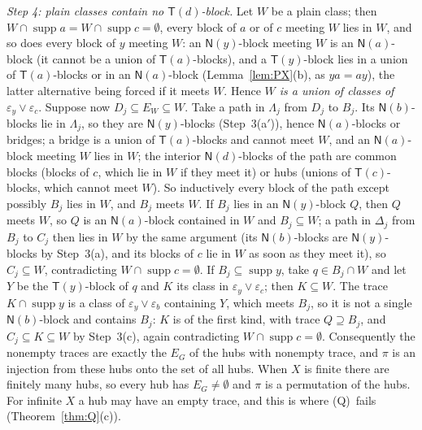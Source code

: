 \documentclass[11pt]{amsart}
\theoremstyle{definition}
\newcommand{\supp}{\operatorname{supp}}
\newcommand{\T}{\mathsf{T}}
\newcommand{\N}{\mathsf{N}}
\newcommand{\Qcond}{\textup{(Q)}}
\begin{document}
\smallskip
\emph{Step 4: plain classes contain no $\T(d)$-block.} Let $W$ be a plain class; then $W\cap\supp a=W\cap\supp c=\emptyset$, every block of $a$ or of $c$ meeting $W$ lies in $W$, and so does every block of $y$ meeting $W$: an $\N(y)$-block meeting $W$ is an $\N(a)$-block (it cannot be a union of $\T(a)$-blocks), and a $\T(y)$-block lies in a union of $\T(a)$-blocks or in an $\N(a)$-block (Lemma~\ref{lem:PX}(b), as $ya=ay$), the latter alternative being forced if it meets $W$. Hence \emph{$W$ is a union of classes of $\varepsilon_y\vee\varepsilon_c$}. Suppose now $D_j\subseteq E_W\subseteq W$. Take a path in $\Lambda_j$ from $D_j$ to $B_j$. Its $\N(b)$-blocks lie in $\Lambda_j$, so they are $\N(y)$-blocks (Step~3(a$'$)), hence $\N(a)$-blocks or bridges; a bridge is a union of $\T(a)$-blocks and cannot meet $W$, and an $\N(a)$-block meeting $W$ lies in $W$; the interior $\N(d)$-blocks of the path are common blocks (blocks of $c$, which lie in $W$ if they meet it) or hubs (unions of $\T(c)$-blocks, which cannot meet $W$). So inductively every block of the path except possibly $B_j$ lies in $W$, and $B_j$ meets $W$. If $B_j$ lies in an $\N(y)$-block $Q$, then $Q$ meets $W$, so $Q$ is an $\N(a)$-block contained in $W$ and $B_j\subseteq W$; a path in $\Delta_j$ from $B_j$ to $C_j$ then lies in $W$ by the same argument (its $\N(b)$-blocks are $\N(y)$-blocks by Step~3(a), and its blocks of $c$ lie in $W$ as soon as they meet it), so $C_j\subseteq W$, contradicting $W\cap\supp c=\emptyset$. If $B_j\subseteq\supp y$, take $q\in B_j\cap W$ and let $Y$ be the $\T(y)$-block of $q$ and $K$ its class in $\varepsilon_y\vee\varepsilon_c$; then $K\subseteq W$. The trace $K\cap\supp y$ is a class of $\varepsilon_y\vee\varepsilon_b$ containing $Y$, which meets $B_j$, so it is not a single $\N(b)$-block and contains $B_j$: $K$ is of the first kind, with trace $Q\supseteq B_j$, and $C_j\subseteq K\subseteq W$ by Step~3(c), again contradicting $W\cap\supp c=\emptyset$. Consequently the nonempty traces are exactly the $E_G$ of the hubs with nonempty trace, and $\pi$ is an injection from these hubs onto the set of all hubs. When $X$ is finite there are finitely many hubs, so every hub has $E_G\ne\emptyset$ and $\pi$ is a permutation of the hubs. For infinite $X$ a hub may have an empty trace, and this is where \Qcond\ fails (Theorem~\ref{thm:Q}(c)).
\end{document}
